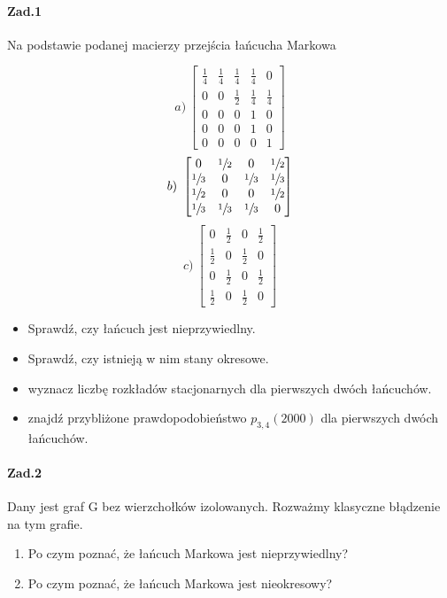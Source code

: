 \documentclass[a4paper,12pt]{article}
\theoremstyle{definition}%
\theoremstyle{definition}
\theoremstyle{problem}
\begin{document}
\paragraph{Zad.1} Na podstawie podanej macierzy przejścia łańcucha Markowa
\begin{multicols}{3}
$$a)\ \begin{bmatrix}
\frac{1}{4}&\frac{1}{4}&\frac{1}{4}&\frac{1}{4}&0\\
0&0&\frac{1}{2}&\frac{1}{4}&\frac{1}{4}\\
0&0&0&1&0\\
0&0&0&1&0\\
0&0&0&0&1
\end{bmatrix}$$
$$b)\ \begin{bmatrix}
0&\sfrac{1}{2}&0&\sfrac{1}{2}\\
\sfrac{1}{3}&0&\sfrac{1}{3}&\sfrac{1}{3}\\
\sfrac{1}{2}&0&0&\sfrac{1}{2}\\
\sfrac{1}{3}&\sfrac{1}{3}&\sfrac{1}{3}&0
\end{bmatrix}$$
$$c)\ \begin{bmatrix}
0&\frac{1}{2}&0&\frac{1}{2}\\
\frac{1}{2}&0&\frac{1}{2}&0\\
0&\frac{1}{2}&0&\frac{1}{2}\\
\frac{1}{2}&0&\frac{1}{2}&0
\end{bmatrix}$$
\end{multicols}
\begin{itemize}
\item Sprawdź, czy łańcuch jest nieprzywiedlny.
\item Sprawdź, czy istnieją w nim stany okresowe.
\item wyznacz liczbę rozkładów stacjonarnych dla pierwszych dwóch łańcuchów.
\item znajdź przybliżone prawdopodobieństwo $p_{3,4}(2000)$ dla pierwszych dwóch łańcuchów.
\end{itemize}

\paragraph{Zad.2} Dany jest graf G bez wierzchołków izolowanych. Rozważmy klasyczne błądzenie na tym grafie.
\begin{enumerate}[label=\alph*)]
\item Po czym poznać, że łańcuch Markowa jest nieprzywiedlny?
\item Po czym poznać, że łańcuch Markowa jest nieokresowy?
\end{enumerate}
\end{document}
